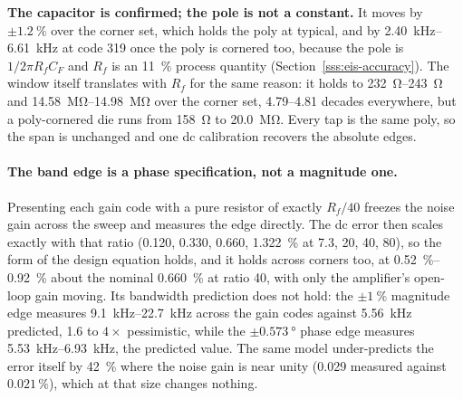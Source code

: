 \textbf{The capacitor is confirmed; the pole is not a constant.} It moves by
\(\pm\SI{1.2}{\percent}\) over the corner set, which holds the poly at typical,
and by \SIrange{2.40}{6.61}{\kilo\hertz} at code 319 once the poly is cornered
too, because the pole is \(1/2\pi R_f C_F\) and \(R_f\) is an
\SI{11}{\percent} process quantity (Section~\ref{sss:eis-accuracy}). The window
itself translates with \(R_f\) for the same reason: it holds to
\SIrange{232}{243}{\ohm} and \SIrange{14.58}{14.98}{\mega\ohm} over the corner
set, \numrange{4.79}{4.81} decades everywhere, but a poly-cornered die runs from
\SI{158}{\ohm} to \SI{20.0}{\mega\ohm}. Every tap is the same poly, so the span
is unchanged and one dc calibration recovers the absolute edges.

\paragraph{The band edge is a phase specification, not a magnitude one.}
Presenting each gain code with a pure resistor of exactly \(R_f/40\) freezes the
noise gain across the sweep and measures the edge directly. The dc error then
scales exactly with that ratio (\num{0.120}, \num{0.330}, \num{0.660},
\SI{1.322}{\percent} at \num{7.3}, \num{20}, \num{40}, \num{80}), so the form
of the design equation holds, and it holds across corners too, at
\SIrange{0.52}{0.92}{\percent} about the nominal \SI{0.660}{\percent} at ratio
\num{40}, with only the amplifier's open-loop gain moving. Its bandwidth
prediction does not hold: the \(\pm\SI{1}{\percent}\) magnitude edge measures
\SIrange{9.1}{22.7}{\kilo\hertz} across the gain codes against
\SI{5.56}{\kilo\hertz} predicted, \num{1.6} to \(4\times\) pessimistic, while the
\(\pm\SI{0.573}{\degree}\) phase edge measures \SIrange{5.53}{6.93}{\kilo\hertz},
the predicted value. The same model under-predicts the error itself by
\SI{42}{\percent} where the noise gain is near unity (\num{0.029} measured
against \(0.021\,\%\)), which at that size changes nothing.

